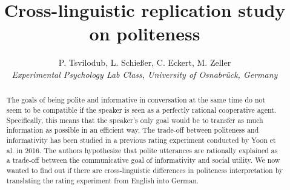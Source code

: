 \documentclass[a4paper,11pt]{article}
\title{Cross-linguistic replication study on politeness}
\author{P. Tsvilodub, L. Schießer, C. Eckert, M. Zeller 
\\ \textit{Experimental Psychology Lab Class, University of Osnabrück, Germany}}
\begin{document}
\maketitle
\begin{abstract}
The goals of being polite and informative in conversation at the same time do not seem to be compatible if the speaker is seen as a perfectly  rational cooperative agent. Specifically, this means that the speaker's only goal would be to transfer as much information as possible in an efficient way. The trade-off between politeness and informativity has been studied in a previous rating experiment conducted by Yoon et al. \cite{yoon2016talking} in 2016. The authors hypothesize that polite utterances are rationally explained as a trade-off between the communicative goal of informativity and social utility. We now wanted to find out if there are cross-linguistic differences in politeness interpretation by translating the rating experiment from English into German.     
\end{abstract}
\end{document}
